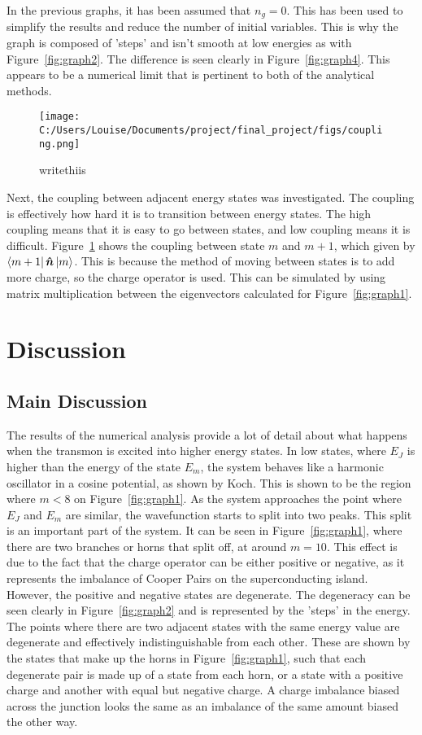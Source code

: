 \documentclass[11pt]{article}
\begin{document}
In the previous graphs, it has been assumed that $n_g = 0$. This has been used to simplify the results and reduce the number of initial variables. This is why the graph is composed of 'steps' and isn't smooth at low energies as with Figure~\ref{fig:graph2}. The difference is seen clearly in Figure~\ref{fig:graph4}. This appears to be a numerical limit that is pertinent to both of the analytical methods.

\begin{figure}[ht]
\centering
\texttt{[image: C:/Users/Louise/Documents/project/final\_project/figs/coupling.png]}
\caption{writethiis}
\label{fig:graph5}
\end{figure}

Next, the coupling between adjacent energy states was investigated. The coupling is effectively how hard it is to transition between energy states. The high coupling means that it is easy to go between states, and low coupling means it is difficult. Figure~\ref{fig:graph5} shows the coupling between state $m$ and $m+1$, which given by $\bra{m+1}\boldsymbol{\hat{n}}\ket{m}$. This is because the method of moving between states is to add more charge, so the charge operator is used. This can be simulated by using matrix multiplication between the eigenvectors calculated for Figure~\ref{fig:graph1}.

\section{Discussion}
\subsection{Main Discussion}
The results of the numerical analysis provide a lot of detail about what happens when the transmon is excited into higher energy states. In low states, where $E_J$ is higher than the energy of the state $E_m$, the system behaves like a harmonic oscillator in a cosine potential, as shown by Koch. This is shown to be the region where $m<8$ on Figure~\ref{fig:graph1}. As the system approaches the point where $E_J$ and $E_m$ are similar, the wavefunction starts to split into two peaks. This split is an important part of the system. It can be seen in Figure~\ref{fig:graph1}, where there are two branches or horns that split off, at around $m=10$. This effect is due to the fact that the charge operator can be either positive or negative, as it represents the imbalance of Cooper Pairs on the superconducting island. However, the positive and negative states are degenerate. The degeneracy can be seen clearly in Figure~\ref{fig:graph2} and is represented by the 'steps' in the energy. The points where there are two adjacent states with the same energy value are degenerate and effectively indistinguishable from each other. These are shown by the states that make up the horns in Figure~\ref{fig:graph1}, such that each degenerate pair is made up of a state from each horn, or a state with a positive charge and another with equal but negative charge. A charge imbalance biased across the junction looks the same as an imbalance of the same amount biased the other way.
\end{document}
